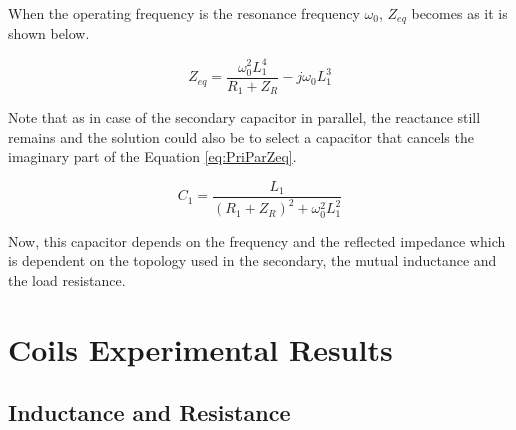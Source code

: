 When the operating frequency is the resonance frequency $\omega_0$, $Z_{eq}$ becomes as it is shown below.

\begin{equation}
Z_{eq} = \frac{\omega_0^2L_1^4}{R_1+Z_R}-j\omega_0L_1^3 
\end{equation}

Note that as in case of the secondary capacitor in parallel, the reactance still remains and the solution could also be to select a capacitor that cancels the imaginary part of the Equation \ref{eq:PriParZeq}.

\begin{equation} \label{Eq:differentCapacitor2}
C_1 = \frac{L_1}{(R_1+Z_R)^2+\omega_0^2L_1^2}
\end{equation} 

Now, this capacitor depends on the frequency and the reflected impedance which is dependent on the topology used in the secondary, the mutual inductance and the load resistance.









\chapter{Coils Experimental Results}
\section{Inductance and Resistance}\label{sec:RL}

